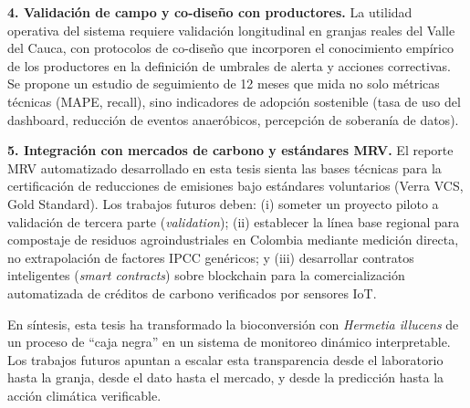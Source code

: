 \textbf{4. Validación de campo y co-diseño con productores.} La utilidad operativa del sistema requiere validación longitudinal en granjas reales del Valle del Cauca, con protocolos de co-diseño que incorporen el conocimiento empírico de los productores en la definición de umbrales de alerta y acciones correctivas. Se propone un estudio de seguimiento de 12 meses que mida no solo métricas técnicas (MAPE, recall), sino indicadores de adopción sostenible (tasa de uso del dashboard, reducción de eventos anaeróbicos, percepción de soberanía de datos).

\textbf{5. Integración con mercados de carbono y estándares MRV.} El reporte MRV automatizado desarrollado en esta tesis sienta las bases técnicas para la certificación de reducciones de emisiones bajo estándares voluntarios (Verra VCS, Gold Standard). Los trabajos futuros deben: (i) someter un proyecto piloto a validación de tercera parte (\emph{validation}); (ii) establecer la línea base regional para compostaje de residuos agroindustriales en Colombia mediante medición directa, no extrapolación de factores IPCC genéricos; y (iii) desarrollar contratos inteligentes (\emph{smart contracts}) sobre blockchain para la comercialización automatizada de créditos de carbono verificados por sensores IoT.

En síntesis, esta tesis ha transformado la bioconversión con \emph{Hermetia illucens} de un proceso de ``caja negra'' en un sistema de monitoreo dinámico interpretable. Los trabajos futuros apuntan a escalar esta transparencia desde el laboratorio hasta la granja, desde el dato hasta el mercado, y desde la predicción hasta la acción climática verificable.
